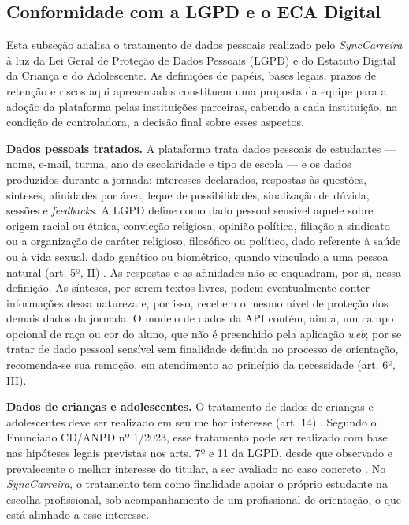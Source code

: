 \subsection{Conformidade com a LGPD e o ECA Digital}

Esta subseção analisa o tratamento de dados pessoais realizado pelo \textit{SyncCarreira} à luz da Lei Geral de Proteção de Dados Pessoais (LGPD) e do Estatuto Digital da Criança e do Adolescente. As definições de papéis, bases legais, prazos de retenção e riscos aqui apresentadas constituem uma proposta da equipe para a adoção da plataforma pelas instituições parceiras, cabendo a cada instituição, na condição de controladora, a decisão final sobre esses aspectos.

\textbf{Dados pessoais tratados.} A plataforma trata dados pessoais de estudantes --- nome, e-mail, turma, ano de escolaridade e tipo de escola --- e os dados produzidos durante a jornada: interesses declarados, respostas às questões, sínteses, afinidades por área, leque de possibilidades, sinalização de dúvida, sessões e \textit{feedbacks}. A LGPD define como dado pessoal sensível aquele sobre origem racial ou étnica, convicção religiosa, opinião política, filiação a sindicato ou a organização de caráter religioso, filosófico ou político, dado referente à saúde ou à vida sexual, dado genético ou biométrico, quando vinculado a uma pessoa natural (art. 5º, II) \cite{brasil2018lgpd}. As respostas e as afinidades não se enquadram, por si, nessa definição. As sínteses, por serem textos livres, podem eventualmente conter informações dessa natureza e, por isso, recebem o mesmo nível de proteção dos demais dados da jornada. O modelo de dados da API contém, ainda, um campo opcional de raça ou cor do aluno, que não é preenchido pela aplicação \textit{web}; por se tratar de dado pessoal sensível sem finalidade definida no processo de orientação, recomenda-se sua remoção, em atendimento ao princípio da necessidade (art. 6º, III).

\textbf{Dados de crianças e adolescentes.} O tratamento de dados de crianças e adolescentes deve ser realizado em seu melhor interesse (art. 14) \cite{brasil2018lgpd}. Segundo o Enunciado CD/ANPD nº 1/2023, esse tratamento pode ser realizado com base nas hipóteses legais previstas nos arts. 7º e 11 da LGPD, desde que observado e prevalecente o melhor interesse do titular, a ser avaliado no caso concreto \cite{anpd2023enunciado}. No \textit{SyncCarreira}, o tratamento tem como finalidade apoiar o próprio estudante na escolha profissional, sob acompanhamento de um profissional de orientação, o que está alinhado a esse interesse.

